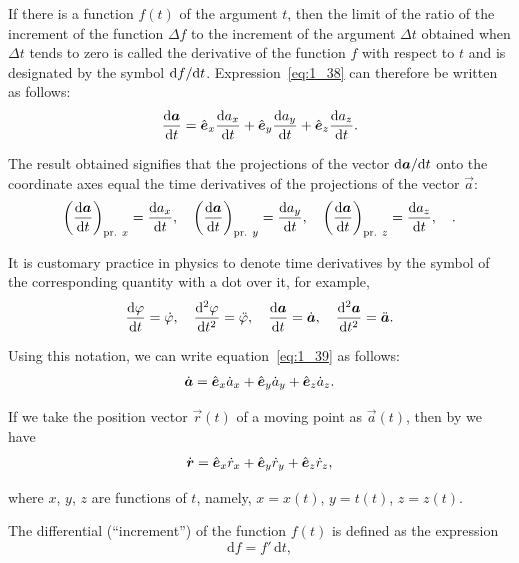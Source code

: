 If there is a function $f(t)$ of the argument $t$, then the limit of the ratio of the increment of the function $\Delta f$ to the increment of the argument $\Delta t$ obtained when $\Delta t$ tends to zero is called the derivative of the function $f$ with respect to $t$ and is designated by the symbol $\mathrm{d} f/\mathrm{d} t$. Expression~\eqref{eq:1_38} can therefore be written as follows:
\begin{equation}\label{eq:1_39}
\frac{\mathrm{d}\boldsymbol{a}}{\mathrm{d} t} = \hat{\boldsymbol{e}}_{x}\frac{\mathrm{d} a_x}{\mathrm{d} t} + \hat{\boldsymbol{e}}_{y}\frac{\mathrm{d} a_y}{\mathrm{d} t} + \hat{\boldsymbol{e}}_{z}\frac{\mathrm{d} a_z}{\mathrm{d} t}.
\end{equation}

\noindent
The result obtained signifies that the projections of the vector $\mathrm{d}\boldsymbol{a}/\mathrm{d} t$ onto the coordinate axes equal the time derivatives of the projections of the vector $\vec{a}$:
\begin{equation}\label{eq:1_40}
\left(\frac{\mathrm{d}\boldsymbol{a}}{\mathrm{d} t}\right)_{\text{pr. }x} = \frac{\mathrm{d} a_x}{\mathrm{d} t},\quad \left(\frac{\mathrm{d}\boldsymbol{a}}{\mathrm{d} t}\right)_{\text{pr. }y} = \frac{\mathrm{d} a_y}{\mathrm{d} t},\quad \left(\frac{\mathrm{d}\boldsymbol{a}}{\mathrm{d} t}\right)_{\text{pr. }z} = \frac{\mathrm{d} a_z}{\mathrm{d} t},\quad.
\end{equation}

It is customary practice in physics to denote time derivatives by the symbol of the corresponding quantity with a dot over it, for example,
\begin{equation}\label{eq:1_41}
\frac{\mathrm{d}\varphi}{\mathrm{d} t} = \dot{\varphi},\quad \frac{\mathrm{d}^2\varphi}{\mathrm{d} t^2} = \ddot{\varphi},\quad \frac{\mathrm{d}\boldsymbol{a}}{\mathrm{d} t} = \dot{\boldsymbol{a}},\quad \frac{\mathrm{d}^2\boldsymbol{a}}{\mathrm{d} t^2} = \ddot{\boldsymbol{a}}.
\end{equation}

\noindent
Using this notation, we can write equation~\eqref{eq:1_39} as follows:
\begin{equation}\label{eq:1_42}
\dot{\boldsymbol{a}} = \hat{\boldsymbol{e}}_{x}\dot{a}_x + \hat{\boldsymbol{e}}_{y}\dot{a}_y + \hat{\boldsymbol{e}}_{z}\dot{a}_z.
\end{equation}

\noindent
If we take the position vector $\vec{r}(t)$ of a moving point as $\vec{a}(t)$, then by  we have
\begin{equation}\label{eq:1_43}
\dot{\boldsymbol{r}} = \hat{\boldsymbol{e}}_{x}\dot{r}_x + \hat{\boldsymbol{e}}_{y}\dot{r}_y + \hat{\boldsymbol{e}}_{z}\dot{r}_z,
\end{equation}

\noindent
where $x$, $y$, $z$ are functions of $t$, namely, $x=x(t)$, $y=t(t)$, $z=z(t)$.

The differential (``increment'') of the function $f(t)$ is defined as the expression
\begin{equation}\label{eq:1_44}
\mathrm{d}f = f'\, \mathrm{d}t,
\end{equation}

